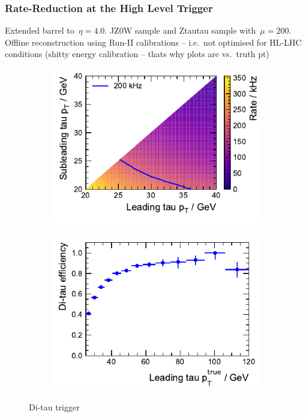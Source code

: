 \subsubsection{Rate-Reduction at the High Level Trigger}
\label{sec:hlt_rate_reduction}

Extended barrel to~$\eta = \num{4.0}$. JZ0W sample  and
Ztautau sample with~$\mu = \num{200}$. Offline reconstruction using Run-II
calibrations -- i.e.\ not optimised for HL-LHC conditions (shitty energy
calibration -- thats why plots are vs.\ truth pt)

\begin{figure}[htb]
  \centering
  \begin{subfigure}[t]{0.48\textwidth}
    \centering
    \includegraphics{./figures/rnn/trigger/pt_rate_reg.pdf}
  \end{subfigure}\hfill
  \begin{subfigure}[t]{0.48\textwidth}
    \centering
    \includegraphics{./figures/rnn/trigger/taueff_reg.pdf}
  \end{subfigure}
  \caption{Di-tau trigger}
  \label{fig:rnn_ditau_trigger}
\end{figure}

